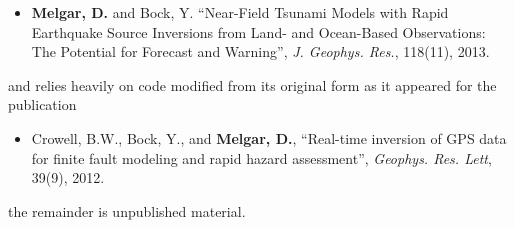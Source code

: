 \begin{frontmatter}
\begin{acknowledgements}
\begin{itemize}
\item \textbf{Melgar, D.} and Bock, Y. ``Near-Field Tsunami Models with Rapid Earthquake Source Inversions from Land- and Ocean-Based Observations: The Potential for Forecast and Warning'', \emph{J. Geophys. Res.}, 118(11), 2013.
\end{itemize}
and relies heavily on code modified from its original form as it appeared for the publication
\begin{itemize}
\item Crowell, B.W., Bock, Y., and \textbf{Melgar, D.}, ``Real-time inversion of GPS data for finite fault modeling and rapid hazard assessment'', \emph{Geophys. Res. Lett}, 39(9), 2012.
\end{itemize}
the remainder is unpublished material.


\end{acknowledgements}



\end{frontmatter}
